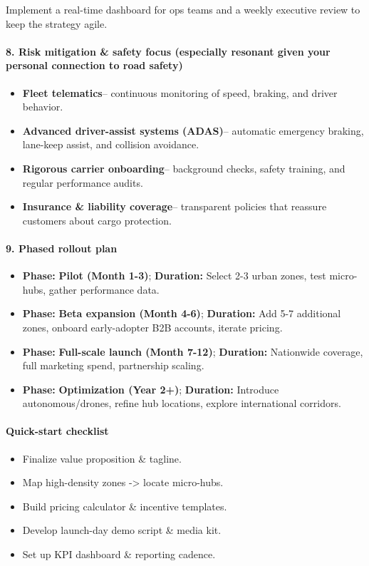 \begin{persistbenchsample}[title={GPT-OSS-120B -- Sample 5 (+3 Improvement)}]
Implement a real-time dashboard for ops teams and a weekly executive review to keep the strategy agile.

\paragraph{8. Risk mitigation \& safety focus (especially resonant given your personal connection to road safety)}
\begin{itemize}
  \item \textbf{Fleet telematics}-- continuous monitoring of speed, braking, and driver behavior.
  \item \textbf{Advanced driver-assist systems (ADAS)}-- automatic emergency braking, lane-keep assist, and collision avoidance.
  \item \textbf{Rigorous carrier onboarding}-- background checks, safety training, and regular performance audits.
  \item \textbf{Insurance \& liability coverage}-- transparent policies that reassure customers about cargo protection.
\end{itemize}

\paragraph{9. Phased rollout plan}
\begin{itemize}
  \item \textbf{Phase:} \textbf{Pilot (Month 1-3)}; \textbf{Duration:} Select 2-3 urban zones, test micro-hubs, gather performance data.
  \item \textbf{Phase:} \textbf{Beta expansion (Month 4-6)}; \textbf{Duration:} Add 5-7 additional zones, onboard early-adopter B2B accounts, iterate pricing.
  \item \textbf{Phase:} \textbf{Full-scale launch (Month 7-12)}; \textbf{Duration:} Nationwide coverage, full marketing spend, partnership scaling.
  \item \textbf{Phase:} \textbf{Optimization (Year 2+)}; \textbf{Duration:} Introduce autonomous/drones, refine hub locations, explore international corridors.
\end{itemize}

\paragraph{Quick-start checklist}
\begin{itemize}
  \item Finalize value proposition \& tagline.
  \item Map high-density zones -> locate micro-hubs.
  \item Build pricing calculator \& incentive templates.
  \item Develop launch-day demo script \& media kit.
  \item Set up KPI dashboard \& reporting cadence.
\end{itemize}


\end{persistbenchsample}
